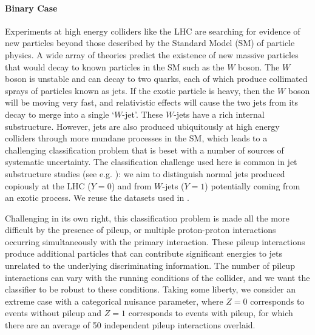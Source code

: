 \documentclass{article}
\theoremstyle{plain}
\begin{document}
\paragraph{Binary Case} Experiments at high energy colliders like the LHC \citep{LHCMachine} are
searching for evidence of new particles beyond those described by the
Standard Model (SM) of particle physics. A wide array of
theories predict the existence of new massive particles that would decay to
known particles in the SM such as the $W$ boson. The $W$ boson is unstable and
can decay to two quarks, each of which produce collimated sprays of particles
known as jets.
If the exotic particle
is heavy, then the $W$ boson will be moving very fast, and  relativistic effects
will cause the two jets from its decay to merge into a single `$W$-jet'. These
$W$-jets have a rich internal substructure.
However,
jets are also produced ubiquitously at high energy colliders through more
mundane processes in the SM, which leads to a challenging classification problem
that is beset with a number of sources of systematic uncertainty.
The classification challenge used here is common in jet substructure
studies (see e.g. \citep{Khachatryan:2014vla,ATL-PHYS-PUB-2015-033,wbosonATLAS}): we aim to distinguish normal jets produced copiously
at the LHC ($Y=0$) and from $W$-jets ($Y=1$) potentially coming from an exotic process.
We reuse the datasets used in
\citep{baldi2016jet}.

Challenging in its own right, this classification
problem is made all the more difficult by the presence of pileup, or multiple
 proton-proton interactions occurring simultaneously with the primary
interaction.  These pileup interactions produce additional particles that can
contribute significant energies to jets unrelated to the underlying
discriminating information. The number of pileup interactions can vary with
the running conditions of the collider, and we want the classifier to be robust
to these conditions. Taking some liberty, we consider an extreme case with
a categorical nuisance parameter, where $Z=0$ corresponds to events without pileup
and $Z=1$ corresponds to events with pileup, for which there are an average  of
50 independent pileup interactions overlaid.
\end{document}
